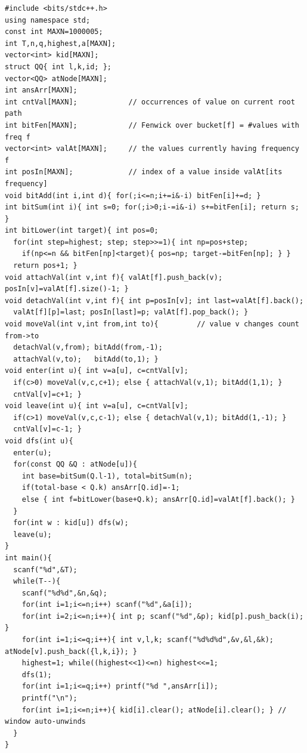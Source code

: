 \begin{lstlisting}[caption={CF 1585E Summit: a DFS from the root uses the recursion stack as the Mo window (enter bumps a value's frequency, leave undoes it); a frequency-of-frequency Fenwick selects the k-th distinct value by increasing count, and per-frequency value stacks hand back an answer value. O((n+q) log n). ASCII only, identifiers without underscores.}, label={lst:c21-summit}]
#include <bits/stdc++.h>
using namespace std;
const int MAXN=1000005;
int T,n,q,highest,a[MAXN];
vector<int> kid[MAXN];
struct QQ{ int l,k,id; };
vector<QQ> atNode[MAXN];
int ansArr[MAXN];
int cntVal[MAXN];            // occurrences of value on current root path
int bitFen[MAXN];            // Fenwick over bucket[f] = #values with freq f
vector<int> valAt[MAXN];     // the values currently having frequency f
int posIn[MAXN];             // index of a value inside valAt[its frequency]
void bitAdd(int i,int d){ for(;i<=n;i+=i&-i) bitFen[i]+=d; }
int bitSum(int i){ int s=0; for(;i>0;i-=i&-i) s+=bitFen[i]; return s; }
int bitLower(int target){ int pos=0;
  for(int step=highest; step; step>>=1){ int np=pos+step;
    if(np<=n && bitFen[np]<target){ pos=np; target-=bitFen[np]; } }
  return pos+1; }
void attachVal(int v,int f){ valAt[f].push_back(v); posIn[v]=valAt[f].size()-1; }
void detachVal(int v,int f){ int p=posIn[v]; int last=valAt[f].back();
  valAt[f][p]=last; posIn[last]=p; valAt[f].pop_back(); }
void moveVal(int v,int from,int to){         // value v changes count from->to
  detachVal(v,from); bitAdd(from,-1);
  attachVal(v,to);   bitAdd(to,1); }
void enter(int u){ int v=a[u], c=cntVal[v];
  if(c>0) moveVal(v,c,c+1); else { attachVal(v,1); bitAdd(1,1); }
  cntVal[v]=c+1; }
void leave(int u){ int v=a[u], c=cntVal[v];
  if(c>1) moveVal(v,c,c-1); else { detachVal(v,1); bitAdd(1,-1); }
  cntVal[v]=c-1; }
void dfs(int u){
  enter(u);
  for(const QQ &Q : atNode[u]){
    int base=bitSum(Q.l-1), total=bitSum(n);
    if(total-base < Q.k) ansArr[Q.id]=-1;
    else { int f=bitLower(base+Q.k); ansArr[Q.id]=valAt[f].back(); }
  }
  for(int w : kid[u]) dfs(w);
  leave(u);
}
int main(){
  scanf("%d",&T);
  while(T--){
    scanf("%d%d",&n,&q);
    for(int i=1;i<=n;i++) scanf("%d",&a[i]);
    for(int i=2;i<=n;i++){ int p; scanf("%d",&p); kid[p].push_back(i); }
    for(int i=1;i<=q;i++){ int v,l,k; scanf("%d%d%d",&v,&l,&k); atNode[v].push_back({l,k,i}); }
    highest=1; while((highest<<1)<=n) highest<<=1;
    dfs(1);
    for(int i=1;i<=q;i++) printf("%d ",ansArr[i]);
    printf("\n");
    for(int i=1;i<=n;i++){ kid[i].clear(); atNode[i].clear(); } // window auto-unwinds
  }
}
\end{lstlisting}

